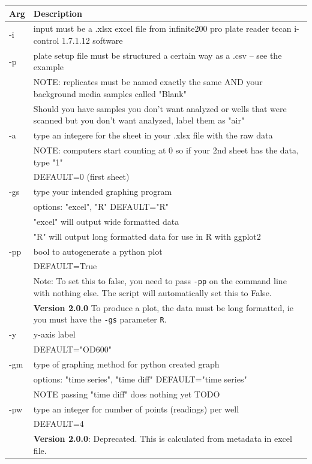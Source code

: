 \documentclass[12pt]{article}
\begin{document}
\begin{center}
\begin{xltabular}{\textwidth}{lX}
Arg & Description\\
\hline
-i & input must be a .xlsx excel file from infinite200 pro plate reader tecan i-control 1.7.1.12 software\\
\hline
-p & plate setup file must be structured a certain way as a .csv -- see the example\\
 & NOTE: replicates must be named exactly the same AND your background media samples called "Blank"\\
 & Should you have samples you don't want analyzed or wells that were scanned but you don't want analyzed, label them as "air"\\
\hline
-a & type an integere for the sheet in your .xlsx file with the raw data\\
 & NOTE: computers start counting at 0 so if your 2nd sheet has the data, type "1"\\
 & DEFAULT=0 (first sheet)\\
\hline
-gs & type your intended graphing program\\
 & options: "excel", "R" DEFAULT="R"\\
 & "excel" will output wide formatted data\\
 & "R" will output long formatted data for use in R with ggplot2\\
\hline
-pp & bool to autogenerate a python plot\\
 & DEFAULT=True\\
 & Note: To set this to false, you need to pass \texttt{-pp} on the command line with nothing else. The script will automatically set this to False.\\
 & \textbf{Version 2.0.0} To produce a plot, the data must be long formatted, ie you must have the \texttt{-gs} parameter \texttt{R}.\\
\hline
-y & y-axis label\\
 & DEFAULT="OD600"\\
\hline
-gm & type of graphing method for python created graph\\
 & options: "time series", "time diff" DEFAULT="time series"\\
 & NOTE passing "time diff" does nothing yet TODO\\
\hline
-pw & type an integer for number of points (readings) per well\\
 & DEFAULT=4\\
 & \textbf{Version 2.0.0}: Deprecated. This is calculated from metadata in excel file.\\

\end{xltabular}
\end{center}
\end{document}
